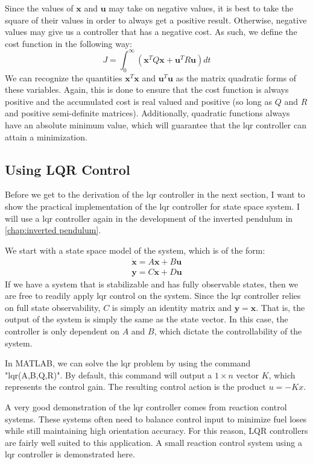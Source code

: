 Since the values of $\bm{x}$ and $\bm{u}$ may take on negative values, it is best to take the square of their values in order to always get a positive result. Otherwise, negative values may give us a controller that has a negative cost. As such, we define the cost function in the following way:
$$J=\int_0^\infty(\bm{x}^TQ\bm{x}+\bm{u}^TR\bm{u})dt$$
We can recognize the quantities $\bm{x}^T\bm{x}$ and $\bm{u}^T\bm{u}$ as the matrix quadratic forms of these variables. Again, this is done to ensure that the cost function is always positive and the accumulated cost is real valued and positive (so long as $Q$ and $R$ and positive semi-definite matrices). Additionally, quadratic functions always have an absolute minimum value, which will guarantee that the \gls{lqr} controller can attain a minimization.

\subsection{Using LQR Control}
Before we get to the derivation of the \gls{lqr} controller in the next section, I want to show the practical implementation of the \gls{lqr} controller for state space system. I will use a \gls{lqr} controller again in the development of the inverted pendulum in \autoref{chap:inverted pendulum}.

We start with a state space model of the system, which is of the form:
\begin{align}
\dot{\bm{x}}=A\bm{x}+B\bm{u}\\
\bm{y}=C\bm{x}+D\bm{u}
\end{align}
If we have a system that is stabilizable and has fully observable states, then we are free to readily apply \gls{lqr} control on the system. Since the \gls{lqr} controller relies on full state observability, $C$ is simply an identity matrix and $\bm{y}=\bm{x}$. That is, the output of the system is simply the same as the state vector. In this case, the controller is only dependent on $A$ and $B$, which dictate the controllability of the system.

In MATLAB, we can solve the \gls{lqr} problem by using the command "lqr(A,B,Q,R)". By default, this command will output a $1\times n$ vector $K$, which represents the control gain. The resulting control action is the product $u=-Kx$.

\begin{example}
    A very good demonstration of the \gls{lqr} controller comes from reaction control systems. These systems often need to balance control input to minimize fuel loses while still maintaining high orientation accuracy. For this reason, LQR controllers are fairly well suited to this application. A small reaction control system using a \gls{lqr} controller is demonstrated here.
\end{example}


